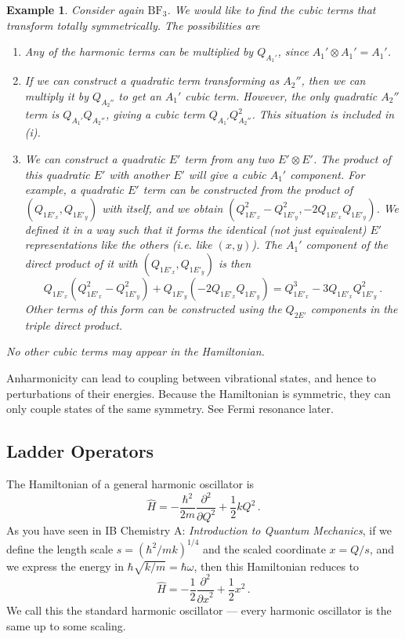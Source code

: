 \documentclass{article}
\theoremstyle{plain}\theoremheaderfont{\normalfont\itshape}\theorembodyfont{\rmfamily}\theoremseparator{.}\newtheorem*{rem}{Remark}\newtheorem*{ex}{Example}\newtheorem*{proof}{Proof}\newtheorem*{altp}{Alternative proof}
\theoremstyle{plain}\theoremheaderfont{\normalfont\bfseries}\theorembodyfont{\rmfamily}\theoremseparator{.}\newtheorem{thm}{Theorem}[section]\newtheorem{lem}[thm]{Lemma}\newtheorem{prop}[thm]{Proposition}\newtheorem*{cor}{Corollary}\newtheorem{defn}[thm]{Definition}\newtheorem{clm}[thm]{Claim}\newtheorem{clminproof}{Claim}\newtheorem*{law}{Law}\newtheorem{pos}[thm]{Postulate}
\theoremstyle{break}\theoremheaderfont{\normalfont\itshape}\theorembodyfont{\rmfamily}\theoremseparator{.\medskip}\newtheorem*{proofskip}{Proof}\newtheorem*{exs}{Examples}\newtheorem*{rems}{Remarks}
\theoremstyle{break}\theoremheaderfont{\normalfont\bfseries}\theorembodyfont{\rmfamily}\theoremseparator{.\medskip}\newtheorem{lemskip}[thm]{Lemma}\newtheorem{defnskip}[thm]{Definition}\newtheorem{propskip}[thm]{Proposition}\newtheorem{thmskip}[thm]{Theorem}
\numberwithin{equation}{section}
\newcommand{\pdv}[3][]{\frac{\partial^{#1} #2}{{\partial #3}^{#1}}}
\begin{document}
    \begin{ex}
        Consider again \(\mathrm{BF_3}\). We would like to find the cubic terms that transform totally symmetrically. The possibilities are
        \begin{enumerate}[topsep=0pt,label=(\roman*)]
            \item Any of the harmonic terms can be multiplied by \(Q_{A_1'}\), since \(A_1'\otimes A_1'=A_1'\).
            \item If we can construct a quadratic term transforming as \(A_2''\), then we can multiply it by \(Q_{A_2''}\) to get an \(A_1'\) cubic term. However, the only quadratic \(A_2''\) term is \(Q_{A_1'}Q_{A_2''}\), giving a cubic term \(Q_{A_1'}Q_{A_2''}^2\). This situation is included in (i).
            \item We can construct a quadratic \(E'\) term from any two \(E'\otimes E'\). The product of this quadratic \(E'\) with another \(E'\) will give a cubic \(A_1'\) component. For example, a quadratic \(E'\) term can be constructed from the product of \((Q_{1E'_x},Q_{1E'_y})\) with itself, and we obtain \((Q_{1E'_x}^2-Q_{1E'_y}^2,-2Q_{1E'_x}Q_{1E'_y})\). We defined it in a way such that it forms the identical (not just equivalent) \(E'\) representations like the others (i.e. like \((x,y)\)). The \(A_1'\) component of the direct product of it with \((Q_{1E'_x},Q_{1E'_y})\) is then
            \begin{equation}
                Q_{1E'_x}(Q_{1E'_x}^2-Q_{1E'_y}^2)+Q_{1E'_y}(-2Q_{1E'_x}Q_{1E'_y})=Q_{1E'_x}^3-3Q_{1E'_x}Q_{1E'_y}^2\,.
            \end{equation}
            Other terms of this form can be constructed using the \(Q_{2E'}\) components in the triple direct product.
        \end{enumerate}

        No other cubic terms may appear in the Hamiltonian.
    \end{ex}

    Anharmonicity can lead to coupling between vibrational states, and hence to perturbations of their energies. Because the Hamiltonian is symmetric, they can only couple states of the same symmetry. See Fermi resonance later.

    \subsection{Ladder Operators}
    The Hamiltonian of a general harmonic oscillator is
    \begin{equation}
        \hat{H}=-\frac{\hbar^2}{2m}\pdv[2]{}{Q}+\frac{1}{2}kQ^2\,.
    \end{equation}
    As you have seen in IB Chemistry A: \textit{Introduction to Quantum Mechanics}, if we define the length scale \(s=(\hbar^2/mk)^{1/4}\) and the scaled coordinate \(x=Q/s\), and we express the energy in \(\hbar\sqrt{k/m}=\hbar\omega\), then this Hamiltonian reduces to
    \begin{equation}
        \hat{H}=-\frac{1}{2}\pdv[2]{}{x}+\frac{1}{2}x^2\,.
    \end{equation}
    We call this the standard harmonic oscillator --- every harmonic oscillator is the same up to some scaling.
\end{document}
